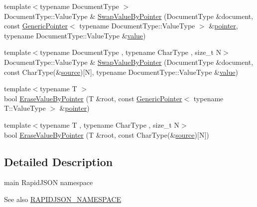 \begin{DoxyCompactItemize}
\item 
{\footnotesize template$<$typename Document\+Type $>$ }\\Document\+Type\+::\+Value\+Type \& \mbox{\hyperlink{namespacerapidjson_a8e7fefa7eb27b5093f8f14439718aae3}{Swap\+Value\+By\+Pointer}} (Document\+Type \&document, const \mbox{\hyperlink{classrapidjson_1_1_generic_pointer}{Generic\+Pointer}}$<$ typename Document\+Type\+::\+Value\+Type $>$ \&\mbox{\hyperlink{namespacerapidjson_aa5b8c07c8721afe6870a0210820ea19d}{pointer}}, typename Document\+Type\+::\+Value\+Type \&\mbox{\hyperlink{namespacerapidjson_a1a75d60792094d496b500c40776030dd}{value}})
\item 
{\footnotesize template$<$typename Document\+Type , typename Char\+Type , size\+\_\+t N$>$ }\\Document\+Type\+::\+Value\+Type \& \mbox{\hyperlink{namespacerapidjson_adb20ad4981c389a8007b5e58b901c558}{Swap\+Value\+By\+Pointer}} (Document\+Type \&document, const Char\+Type(\&\mbox{\hyperlink{namespacerapidjson_a37a3d95ab06aa7542487bb76e704885c}{source}})\mbox{[}N\mbox{]}, typename Document\+Type\+::\+Value\+Type \&\mbox{\hyperlink{namespacerapidjson_a1a75d60792094d496b500c40776030dd}{value}})
\item 
{\footnotesize template$<$typename T $>$ }\\bool \mbox{\hyperlink{namespacerapidjson_adaa0d9adc977720a77aa263a6dedc308}{Erase\+Value\+By\+Pointer}} (T \&root, const \mbox{\hyperlink{classrapidjson_1_1_generic_pointer}{Generic\+Pointer}}$<$ typename T\+::\+Value\+Type $>$ \&\mbox{\hyperlink{namespacerapidjson_aa5b8c07c8721afe6870a0210820ea19d}{pointer}})
\item 
{\footnotesize template$<$typename T , typename Char\+Type , size\+\_\+t N$>$ }\\bool \mbox{\hyperlink{namespacerapidjson_aecef95f2fb3b7418031aeda5558072c5}{Erase\+Value\+By\+Pointer}} (T \&root, const Char\+Type(\&\mbox{\hyperlink{namespacerapidjson_a37a3d95ab06aa7542487bb76e704885c}{source}})\mbox{[}N\mbox{]})
\end{DoxyCompactItemize}


\subsection{Detailed Description}
main Rapid\+J\+S\+ON namespace 

\begin{DoxySeeAlso}{See also}
\mbox{\hyperlink{group___r_a_p_i_d_j_s_o_n___c_o_n_f_i_g_ga743a79d3af927391fe3eb5c979136899}{R\+A\+P\+I\+D\+J\+S\+O\+N\+\_\+\+N\+A\+M\+E\+S\+P\+A\+CE}} 
\end{DoxySeeAlso}


